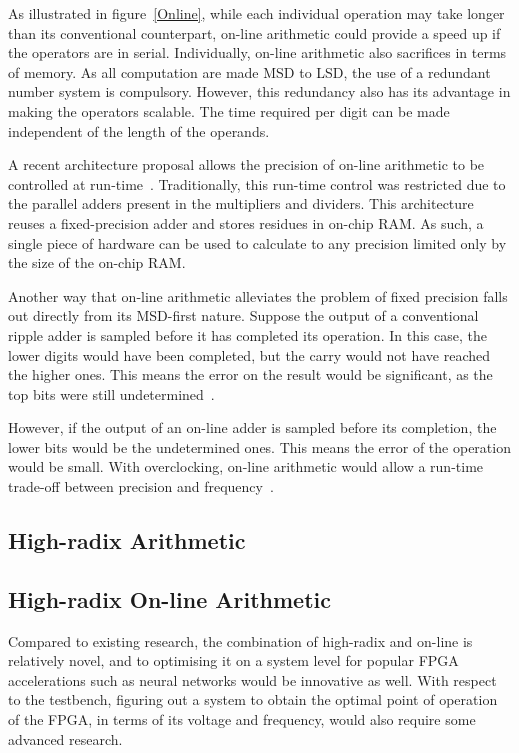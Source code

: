 \documentclass[journal]{IEEEtran}
\begin{document}
As illustrated in figure~\ref{Online}, while each individual operation may
take longer than its conventional counterpart, on-line arithmetic could provide
a speed up if the operators are in serial.
Individually, on-line arithmetic also sacrifices in terms of memory.
As all computation are made MSD to LSD, the use of a redundant number system
is compulsory.
However, this redundancy also has its advantage in making the operators
scalable.
The time required per digit can be made independent of the length of the
operands.~\cite{Trivedi1}

A recent architecture proposal allows the precision of
on-line arithmetic to be controlled at run-time~\cite{Zhao1}.
Traditionally, this run-time control was restricted due to the parallel adders
present in the multipliers and dividers.
This architecture reuses a fixed-precision adder and stores residues in
on-chip RAM.
As such, a single piece of hardware can be used to calculate to any precision
limited only by the size of the on-chip RAM.

Another way that on-line arithmetic alleviates the problem of fixed precision
falls out directly from its MSD-first nature.
Suppose the output of a conventional ripple adder is sampled before
it has completed its operation.
In this case, the lower digits would have been completed, but the carry would
not have reached the higher ones.
This means the error on the result would be significant, as the top bits
were still undetermined~\cite{Shi1}.

However, if the output of an on-line adder is sampled before its completion,
the lower bits would be the undetermined ones.
This means the error of the operation would be small.
With overclocking, on-line arithmetic would allow a run-time trade-off between
precision and frequency~\cite{Shi2}.

\subsection{High-radix Arithmetic}

\subsection{High-radix On-line Arithmetic}
Compared to existing research, the combination of high-radix and on-line is
relatively novel, and to optimising it on a system level for popular FPGA
accelerations such as neural networks would be innovative as well.
With respect to the testbench, figuring out a system to obtain the optimal point
of operation of the FPGA, in terms of its voltage and frequency, would also
require some advanced research.
\end{document}
